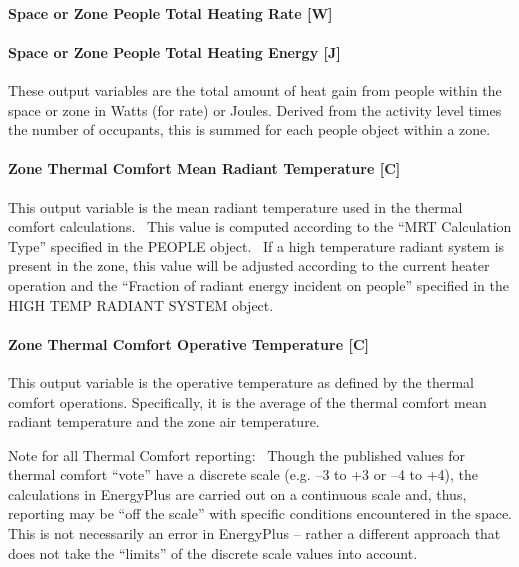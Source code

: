 \paragraph{Space or Zone People Total Heating Rate {[}W{]}}\label{zone-people-total-heating-rate-w}

\paragraph{Space or Zone People Total Heating Energy {[}J{]}}\label{zone-people-total-heating-energy-j}

These output variables are the total amount of heat gain from people within the space or zone in Watts (for rate) or Joules. Derived from the activity level times the number of occupants, this is summed for each people object within a zone.

\paragraph{Zone Thermal Comfort Mean Radiant Temperature {[}C{]}}\label{zone-thermal-comfort-mean-radiant-temperature-c}

This output variable is the mean radiant temperature used in the thermal comfort calculations.~ This value is computed according to the ``MRT Calculation Type'' specified in the PEOPLE object.~ If a high temperature radiant system is present in the zone, this value will be adjusted according to the current heater operation and the ``Fraction of radiant energy incident on people'' specified in the HIGH TEMP RADIANT SYSTEM object.

\paragraph{Zone Thermal Comfort Operative Temperature {[}C{]}}\label{zone-thermal-comfort-operative-temperature-c}

This output variable is the operative temperature as defined by the thermal comfort operations. Specifically, it is the average of the thermal comfort mean radiant temperature and the zone air temperature.

Note for all Thermal Comfort reporting:~ Though the published values for thermal comfort ``vote'' have a discrete scale (e.g. --3 to +3 or --4 to +4), the calculations in EnergyPlus are carried out on a continuous scale and, thus, reporting may be ``off the scale'' with specific conditions encountered in the space. This is not necessarily an error in EnergyPlus -- rather a different approach that does not take the ``limits'' of the discrete scale values into account.

